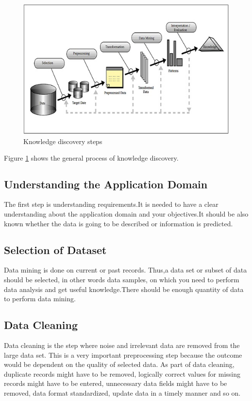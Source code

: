 \begin{figure}
\centering
\includegraphics{Figures/kdsteps.jpg}
\decoRule
\caption{Knowledge discovery steps}
\label{fig:kdsteps}
\end{figure}



Figure \ref{fig:kdsteps} shows the general process of knowledge discovery.

\subsection{Understanding the Application Domain}
The first step is understanding requirements.It is needed to have a clear understanding about the application domain and your objectives.It should be also known whether the data is going to be described or information is predicted.
\subsection{Selection of Dataset}
Data mining is done on current or past records. Thus,a data set or subset of data should be selected, in other words data samples, on which you need to perform data analysis and get useful knowledge.There should be enough quantity of data to perform data mining.
\subsection{Data Cleaning}
Data cleaning is the step where noise and irrelevant data are removed from the large data set. This is a very important preprocessing step because the outcome would be dependent on the quality of selected data. As part of data cleaning, duplicate records might have to be removed, logically correct values for missing records might have to be entered, unnecessary data fields might have to be removed, data format standardized, update data in a timely manner and so on.
